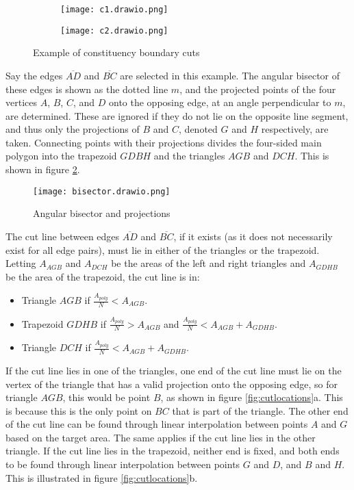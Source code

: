 \documentclass{article}
\begin{document}
\begin{figure}[h]
    \centering
    \begin{subfigure}{0.48\textwidth}
        \centering
        \texttt{[image: c1.drawio.png]}
    \end{subfigure}
    \begin{subfigure}{0.48\textwidth}
        \centering
        \texttt{[image: c2.drawio.png]}
    \end{subfigure}
    \caption{Example of constituency boundary cuts}
    \label{fig:examplecuts}
\end{figure}

Say the edges $\overline{AD}$ and $\overline{BC}$ are selected in this example. The angular bisector of these edges is shown as the dotted line $m$, and the
projected points of the four vertices $A$, $B$, $C$, and $D$ onto the opposing edge, at an angle perpendicular to $m$, are determined. These are ignored if
they do not lie on the opposite line segment, and thus only the projections of $B$ and $C$, denoted $G$ and $H$ respectively, are taken. Connecting points with
their projections divides the four-sided main polygon into the trapezoid $GDBH$ and the triangles $AGB$ and $DCH$. This is shown in figure \ref{fig:bisector}.

\begin{figure}[H]
    \centering
    \texttt{[image: bisector.drawio.png]}
    \caption{Angular bisector and projections}
    \label{fig:bisector}
\end{figure}

The cut line between edges $\overline{AD}$ and $\overline{BC}$, if it exists (as it does not necessarily exist for all edge pairs), must lie in either of
the triangles or the trapezoid. Letting $A_{AGB}$ and $A_{DCH}$ be the areas of the left and right triangles and $A_{GDHB}$ be the area of the trapezoid,
the cut line is in:

\begin{itemize}
    \item Triangle $AGB$ if \(\frac{A_{poly}}{N} < A_{AGB}\).
    \item Trapezoid $GDHB$ if \(\frac{A_{poly}}{N} > A_{AGB}\) and \(\frac{A_{poly}}{N} < A_{AGB} + A_{GDHB}\).
    \item Triangle $DCH$ if \(\frac{A_{poly}}{N} < A_{AGB} + A_{GDHB}\).
\end{itemize}

If the cut line lies in one of the triangles, one end of the cut line must lie on the vertex of the triangle that has a valid projection onto the opposing edge,
so for triangle $AGB$, this would be point $B$, as shown in figure \ref{fig:cutlocations}a. This is because this is the only point on $BC$ that is part of the triangle.
The other end of the cut line can be found through linear interpolation between points $A$ and $G$ based on the target area. The same applies if the cut line lies
in the other triangle. If the cut line lies in the trapezoid, neither end is fixed, and both ends to be found through linear interpolation between points $G$ and $D$, and $B$ and $H$. This is illustrated in figure \ref{fig:cutlocations}b.
\end{document}
